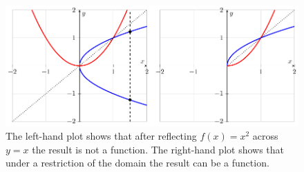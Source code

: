 \begin{figure}[ht!]
    \begin{center}
        \includegraphics[width=0.9\columnwidth]{figures/0-3-fig6.pdf}
    \end{center}
    \caption{The left-hand plot shows that after reflecting $f(x)=x^2$ across $y=x$ the
    result is not a function.  The right-hand plot shows that under a restriction of the
domain the result can be a function.}
    \label{fig:0.3.inv2}
\end{figure}

